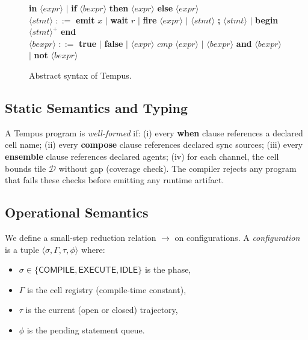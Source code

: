 \documentclass[twocolumn,10pt]{article}
\newcommand{\calD}{\mathcal{D}}     %
\begin{document}
\begin{figure}[ht]
\begin{tabbing}
  \textbf{in} $\langle\mathit{expr}\rangle$
  $\mid$ \textbf{if} $\langle\mathit{bexpr}\rangle$
  \textbf{then} $\langle\mathit{expr}\rangle$
  \textbf{else} $\langle\mathit{expr}\rangle$ \\[2pt]
$\langle\mathit{stmt}\rangle$ \> $::=$ \>
  \textbf{emit} $x$
  $\mid$ \textbf{wait} $r$
  $\mid$ \textbf{fire} $\langle\mathit{expr}\rangle$
  $\mid$ $\langle\mathit{stmt}\rangle$ \textbf{;} $\langle\mathit{stmt}\rangle$
  $\mid$ \textbf{begin} $\langle\mathit{stmt}\rangle^+$ \textbf{end} \\[2pt]
$\langle\mathit{bexpr}\rangle$ \> $::=$ \>
  \textbf{true} $\mid$ \textbf{false}
  $\mid$ $\langle\mathit{expr}\rangle$ $\mathit{cmp}$
  $\langle\mathit{expr}\rangle$
  $\mid$ $\langle\mathit{bexpr}\rangle$ \textbf{and}
  $\langle\mathit{bexpr}\rangle$
  $\mid$ \textbf{not} $\langle\mathit{bexpr}\rangle$
\end{tabbing}
\caption{Abstract syntax of Tempus.}
\label{fig:bnf}
\end{figure}

\subsection{Static Semantics and Typing}

A Tempus program is \emph{well-formed} if:
(i) every \textbf{when} clause references a declared cell name;
(ii) every \textbf{compose} clause references declared sync sources;
(iii) every \textbf{ensemble} clause references declared agents;
(iv) for each channel, the cell bounds tile $\calD$ without gap
  (coverage check).
The compiler rejects any program that fails these checks before
emitting any runtime artifact.

\subsection{Operational Semantics}

We define a small-step reduction relation $\to$ on configurations.
A \emph{configuration} is a tuple $\langle \sigma, \Gamma, \tau,
\phi \rangle$ where:
\begin{itemize}[leftmargin=1.5em,topsep=2pt,itemsep=1pt]
  \item $\sigma \in \{\mathsf{COMPILE},\mathsf{EXECUTE},\mathsf{IDLE}\}$
    is the phase,
  \item $\Gamma$ is the cell registry (compile-time constant),
  \item $\tau$ is the current (open or closed) trajectory,
  \item $\phi$ is the pending statement queue.
\end{itemize}
\end{document}
